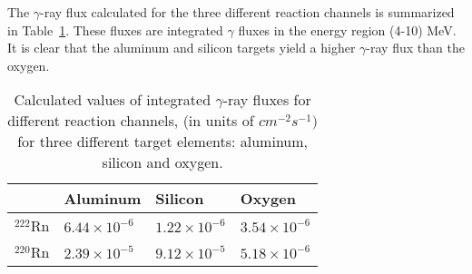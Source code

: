 \documentclass[aps,prc,showpacs,twocolumn,superscriptaddress]{revtex4-1}
\begin{document}
The $\gamma$-ray flux calculated for the three different reaction channels is summarized in Table~\ref{table3}. These fluxes are integrated $\gamma$ fluxes in the energy region (4-10) MeV. It is clear that the aluminum and silicon targets yield a higher $\gamma$-ray flux than the oxygen.
\begin{table}[H]
\centering
\begin{tabular}{|m{1.8cm}|m{1.8cm}|m{1.8cm}|m{1.8cm}|}
\hline
	\toprule 
 	& Aluminum & Silicon & Oxygen \\
    \midrule
	\hline
 	$^{222}$Rn & $6.44\times 10^{-6}$ & $1.22\times10^{-6}$ & $3.54\times10^{-6}$\\ [1ex]
	\hline 
	$^{220}$Rn & $2.39\times 10^{-5}$ & $9.12\times10^{-5}$ & $5.18\times10^{-6}$\\ 
	\bottomrule
	\hline
\end{tabular}
\caption{Calculated values of integrated $\gamma$-ray fluxes for different reaction channels, (in units of $cm^{-2}s^{-1})$ for three different target elements: aluminum, silicon and oxygen. }
\label{table3}
\end{table}
\end{document}
